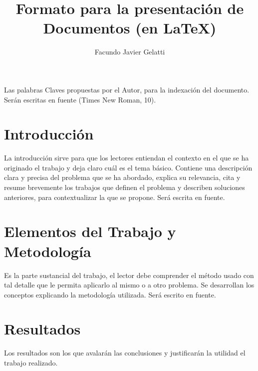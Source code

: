 
\usepackage{amsmath}
\usepackage{amsfonts}
\usepackage{amssymb}

\author{Facundo Javier Gelatti}
\title{Formato para la presentación de Documentos (en \LaTeX)}


\titulo

\begin{multicols}{2}

Las palabras Claves propuestas por el Autor, para la
indexación del documento. Serán escritas en fuente
(Times New Roman, 10).

\section{Introducción}
La introducción sirve para que los lectores
entiendan el contexto en el que se ha originado el
trabajo y deja claro cuál es el tema básico. Contiene
una descripción clara y precisa del problema que se ha
abordado, explica su relevancia, cita y resume
brevemente los trabajos que definen el problema y
describen soluciones anteriores, para contextualizar la
que se propone. Será escrita en fuente.

\section{Elementos del Trabajo y Metodología}
Es la parte sustancial del trabajo, el lector debe
comprender el método usado con tal detalle que le
permita aplicarlo al mismo o a otro problema. Se
desarrollan los conceptos explicando la metodología
utilizada. Será escrito en fuente.

\section{Resultados}
Los resultados son los que avalarán las conclusiones
y justificarán la utilidad el trabajo realizado.


\end{multicols}
